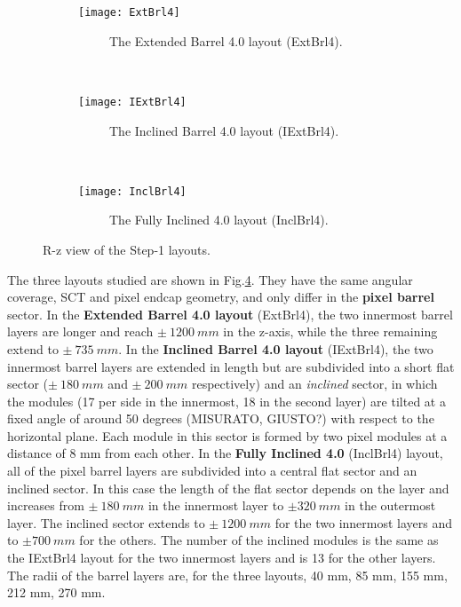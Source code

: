 \documentclass[a4paper,twoside,12pt]{article}
\begin{document}
\begin{figure}
\captionsetup[subfigure]{justification=centering}
\begin{subfigure}{\linewidth}
\centering
\texttt{[image: ExtBrl4]}
\caption{\ \ \ \ \ The Extended Barrel 4.0 layout (ExtBrl4).}
\label{fig:tracking:ExtBrl4}
\end{subfigure}\\[1ex]
\begin{subfigure}{\linewidth}
\centering
\texttt{[image: IExtBrl4]}
\caption{\ \ \ \ \ The Inclined Barrel 4.0 layout (IExtBrl4).}
\label{fig:tracking:IExtBrl4}
\end{subfigure}\\[1ex]
\begin{subfigure}{\linewidth}
\centering
\texttt{[image: InclBrl4]}
\caption{\ \ \ \ \ The Fully Inclined 4.0 layout (InclBrl4).}
\label{fig:tracking:InclBrl4}
\end{subfigure}
\caption{R-z view of the Step-1 layouts.}
\label{fig:tracking:layouts}
\end{figure}


The three layouts studied are shown in Fig.\ref{fig:tracking:layouts}. They have the same angular coverage, SCT and pixel endcap geometry, and only differ in the \textbf{pixel barrel} sector.
In the \textbf{Extended Barrel 4.0 layout} (ExtBrl4), the two innermost barrel layers are longer and
reach $\pm\ 1200\ mm$ in the z-axis, while the three remaining extend to $\pm\ 735\ mm$.
In the \textbf{Inclined Barrel 4.0 layout} (IExtBrl4), the two innermost barrel layers
are extended in length but are subdivided into a short flat sector ($\pm\ 180\ mm$ and $\pm\ 200\ mm$ respectively) and 
 an \textit{inclined} sector, in which the modules (17 per side in the innermost, 18 in the second layer) are tilted at a fixed angle of around 50 degrees (MISURATO, GIUSTO?) with respect to the horizontal plane.
Each module in this sector is formed by two pixel modules at a distance of 8 mm from each other. In the \textbf{Fully Inclined 4.0} (InclBrl4) layout,
all of the pixel barrel layers are subdivided into a central flat sector and an inclined sector. In this case the length of the flat sector depends
on the layer and increases from $\pm\ 180\ mm$ in the innermost layer to $\pm 320\ mm$ in the outermost layer. The inclined sector extends
to $\pm\ 1200\ mm$ for the two innermost layers and to $\pm 700\ mm$ for the others. The number of the inclined modules is the same as the IExtBrl4 layout for the two innermost
layers and is 13 for the other layers. The radii of the barrel layers are, for the three layouts, 40 mm, 85 mm, 155 mm, 212 mm, 270 mm. \\\\
\end{document}
